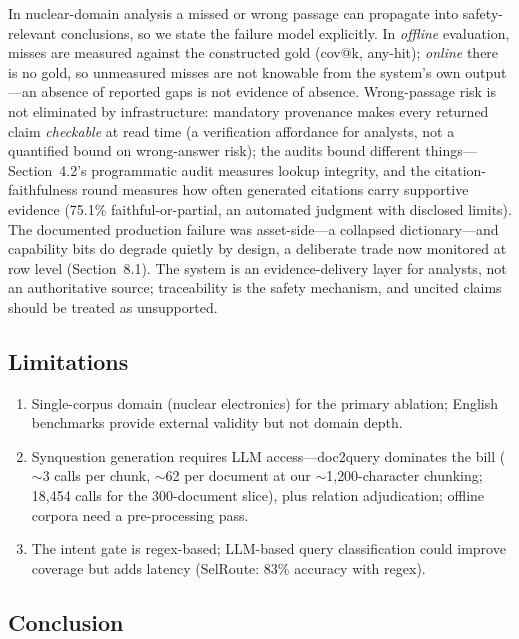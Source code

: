 \documentclass[sigconf,nonacm]{acmart}
\begin{document}
In nuclear-domain analysis a missed or wrong passage can propagate into
safety-relevant conclusions, so we state the failure model explicitly.
In \emph{offline} evaluation, misses are measured against the
constructed gold (cov@k, any-hit); \emph{online} there is no gold, so
unmeasured misses are not knowable from the system's own output---an
absence of reported gaps is not evidence of absence. Wrong-passage risk
is not eliminated by infrastructure: mandatory provenance makes every
returned claim \emph{checkable} at read time (a verification
affordance for analysts, not a quantified bound on wrong-answer risk);
the audits bound different things---Section~4.2's programmatic audit
measures lookup integrity, and the citation-faithfulness round measures
how often generated citations carry supportive evidence (75.1\%
faithful-or-partial, an automated judgment with disclosed limits). The
documented production failure was
asset-side---a collapsed dictionary---and capability bits do degrade
quietly by design, a deliberate trade now monitored at row level
(Section~8.1). The system is an evidence-delivery layer for analysts,
not an authoritative source; traceability is the safety mechanism, and
uncited claims should be treated as unsupported.

\subsection{Limitations}

\begin{enumerate}
\item Single-corpus domain (nuclear electronics) for the primary ablation;
English benchmarks provide external validity but not domain depth.
\item Synquestion generation requires LLM access---doc2query dominates the
bill (${\sim}$3 calls per chunk, ${\sim}$62 per document at our
${\sim}$1{,}200-character chunking; 18{,}454 calls for the 300-document
slice), plus relation adjudication; offline corpora need a pre-processing
pass.
\item The intent gate is regex-based; LLM-based query classification could
improve coverage but adds latency (SelRoute: 83\% accuracy with regex).
\end{enumerate}

\subsection{Conclusion}
\end{document}
